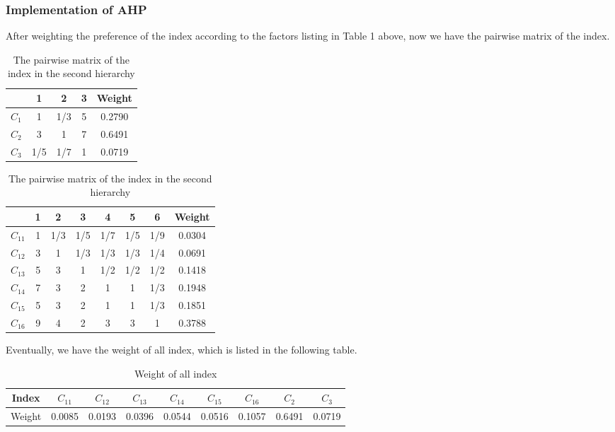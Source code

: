 \newpage
\subsubsection{Implementation of AHP}
After weighting the preference of the index according to the factors listing in Table 1 above, now we have the pairwise matrix of the index.


\begin{table}[!htbp]
\center
\begin{tabular}{|c|c|c|c|c|}


\hline
  &1	&2&	3	&Weight\\
\hline

$C_1$&1	&1/3&	5	&0.2790\\
\hline
$C_2$&3	&1	&7	&0.6491\\
\hline
$C_3$&1/5	&1/7	&1&	0.0719\\
\hline
\end{tabular} 
\caption{The pairwise matrix of the index in the second hierarchy}
\end{table}


\begin{table}[!htbp]
\center
\begin{tabular}{|c|c|c|c|c|c|c|c|}


\hline
  &1	&2	&3	&4	&5	&6	&Weight\\
\hline

$C_{11}$&1	&1/3	&1/5	&1/7&	1/5	&1/9	&0.0304\\
\hline
$C_{12}$&3	&1	&1/3&	1/3	&1/3	&1/4	&0.0691\\
\hline
$C_{13}$&5	&3	&1	&1/2&	1/2&	1/2	&0.1418\\
\hline
$C_{14}$&7	&3	&2	&1	&1	&1/3&	0.1948\\
\hline
$C_{15}$&5	&3	&2	&1	&1	&1/3	&0.1851\\
\hline
$C_{16}$&9	&4	&2	&3	&3	&1	&0.3788\\
\hline
\end{tabular} 
\caption{The pairwise matrix of the index in the second hierarchy}
\end{table}

Eventually, we have the weight of all index, which is listed in the following table.


\begin{table}[!htbp]
\center
\begin{tabular}{|c|c|c|c|c|c|c|c|c|}



\hline

Index&$C_11$&$C_12$&$C_13$&$C_14$&$C_15$&$C_16$&$C_2$&$C_3$\\
\hline
Weight&0.0085&	0.0193&	0.0396&	0.0544&	0.0516&	0.1057&	0.6491&	0.0719\\
\hline

\end{tabular} 
\caption{Weight of all index}
\end{table}


